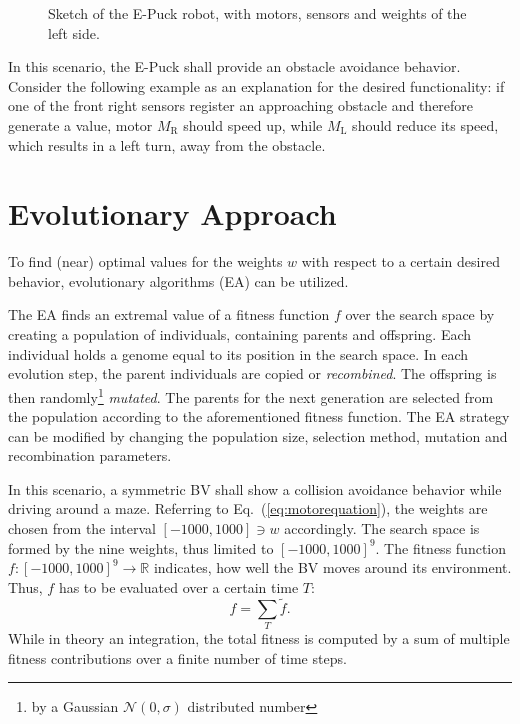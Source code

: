 \documentclass[a4paper]{jacow}
\begin{document}
\begin{figure}[hbt]
	\centering
	
	\caption{Sketch of the E-Puck robot, with motors, sensors and weights of the left side.}
	\label{fig:epuck}
\end{figure}

In this scenario, the E-Puck shall provide an obstacle avoidance behavior. Consider the following example as an explanation for the desired functionality: if one of the front right sensors register an approaching obstacle and therefore generate a value, motor $M_\mathrm{R}$ should speed up, while $M_\mathrm{L}$ should reduce its speed, which results in a left turn, away from the obstacle.

\section{Evolutionary Approach}

To find (near) optimal values for the weights $w$ with respect to a certain desired behavior, evolutionary algorithms (EA) can be utilized.

The EA finds an extremal value of a fitness function $f$ over the search space by creating a population of individuals, containing parents and offspring. Each individual holds a genome equal to its position in the search space. In each evolution step, the parent individuals are copied or \emph{recombined}. The offspring is then randomly\footnote{by a Gaussian $\mathcal{N}(0,\sigma)$ distributed number} \emph{mutated}. The parents for the next generation are selected from the population according to the aforementioned fitness function. The EA strategy can be modified by changing the population size, selection method, mutation and recombination parameters.

In this scenario, a symmetric BV shall show a collision avoidance behavior while driving around a maze. Referring to Eq.~(\ref{eq:motorequation}), the weights are chosen from the interval $[-1000,1000]\ni w$ accordingly. The search space is formed by the nine weights, thus limited to $[-1000,1000]^9$. The fitness function \mbox{$f:[-1000,1000]^9\to \mathbb{R}$} indicates, how well the BV moves around its environment. Thus, $f$ has to be evaluated over a certain time $T$:
\begin{equation}
	f = \sum\limits_T \tilde{f}.
\end{equation}
While in theory an integration, the total fitness is computed by a sum of multiple fitness contributions over a finite number of time steps. 
\end{document}
